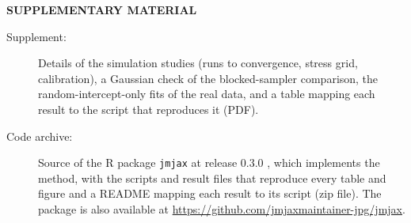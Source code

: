 \label{supplementary-material}
\bigskip

\begin{center}
{\large\bf SUPPLEMENTARY MATERIAL}
\end{center}

\begin{description}
\item[Supplement:] Details of the simulation studies (runs to
convergence, stress grid, calibration), a Gaussian check of the
blocked-sampler comparison, the random-intercept-only fits of the real
data, and a table mapping each result to the script that reproduces it
(PDF).
\item[Code archive:] Source of the R package \texttt{jmjax} at release
0.3.0 \citep{jmjax}, which implements the method, with the scripts and
result files that reproduce every table and figure and a README mapping
each result to its script (zip file). The package is also available at
\url{https://github.com/jmjaxmaintainer-jpg/jmjax}.
\end{description}
